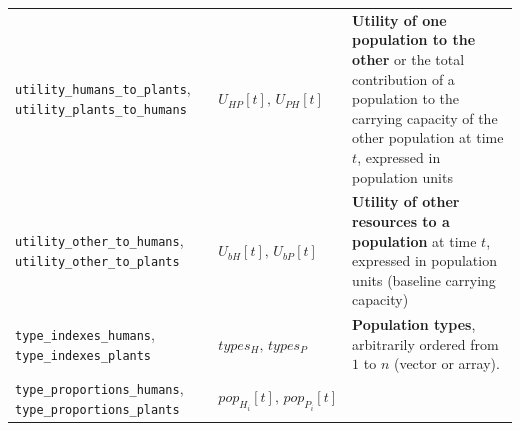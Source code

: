 \documentclass[
]{book}
\begin{document}
\begin{longtable}[]{@{}lll@{}}
\begin{minipage}[t]{0.36\columnwidth}\raggedright
\texttt{utility\_humans\_to\_plants}, \texttt{utility\_plants\_to\_humans}\strut
\end{minipage} & \begin{minipage}[t]{0.21\columnwidth}\raggedright
\(U_{HP}[t],\,U_{PH}[t]\)\strut
\end{minipage} & \begin{minipage}[t]{0.34\columnwidth}\raggedright
\textbf{Utility of one population to the other} or the total contribution of a population to the carrying capacity of the other population at time \(t\), expressed in population units\strut
\end{minipage}\tabularnewline
\begin{minipage}[t]{0.36\columnwidth}\raggedright
\texttt{utility\_other\_to\_humans}, \texttt{utility\_other\_to\_plants}\strut
\end{minipage} & \begin{minipage}[t]{0.21\columnwidth}\raggedright
\(U_{bH}[t],\,U_{bP}[t]\)\strut
\end{minipage} & \begin{minipage}[t]{0.34\columnwidth}\raggedright
\textbf{Utility of other resources to a population} at time \(t\), expressed in population units (baseline carrying capacity)\strut
\end{minipage}\tabularnewline
\begin{minipage}[t]{0.36\columnwidth}\raggedright
\texttt{type\_indexes\_humans}, \texttt{type\_indexes\_plants}\strut
\end{minipage} & \begin{minipage}[t]{0.21\columnwidth}\raggedright
\(types_{H},\,types_{P}\)\strut
\end{minipage} & \begin{minipage}[t]{0.34\columnwidth}\raggedright
\textbf{Population types}, arbitrarily ordered from \(1\) to \(n\) (vector or array).\strut
\end{minipage}\tabularnewline
\begin{minipage}[t]{0.36\columnwidth}\raggedright
\texttt{type\_proportions\_humans}, \texttt{type\_proportions\_plants}\strut
\end{minipage} & \begin{minipage}[t]{0.21\columnwidth}\raggedright
\(pop_{H_{i}}[t],\,pop_{P_{i}}[t]\)\strut
\end{minipage} & \begin{minipage}[t]{0.34\columnwidth}\raggedright

\end{minipage}
\end{longtable}
\end{document}

